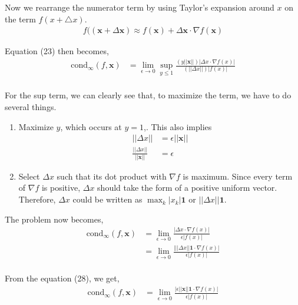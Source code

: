 \documentclass{scrartcl}
\begin{document}
Now we rearrange the numerator term by using Taylor's expansion around $x$ on the term $f(x+\triangle x)$.
\begin{align}
f((\mathbf{x}+\Delta \mathbf{x}) \approx f(\mathbf{x}) + \Delta \mathbf{x} \cdot \nabla f(\mathbf{x})
\end{align}

Equation (23) then becomes, 
\begin{align}
\textrm{cond}_\infty (f,\mathbf{x}) 
&=\lim\limits_{\epsilon \rightarrow 0}\sup_{y \leq 1} \frac{(y||\mathbf{x}||) |\Delta x \cdot \nabla f(x)|}{(||\Delta x||) |f(x)|}\\
\end{align}

For the sup term, we can clearly see that, to maximize the term, we have to do several things.\\
\begin{enumerate}

\item Maximize $y$, which occurs at $y = 1$,. This also implies 
\begin{align}
||\Delta x|| &= \epsilon||\mathbf{x}||\\
\frac{||\Delta x||}{||\mathbf{x}||} &= \epsilon
\end{align}

\item Select $\Delta x$ such that its dot product with $\nabla f$ is maximum. Since every term of $\nabla f$ is positive, $\Delta x$ should take the form of a positive uniform vector. Therefore, $\Delta x$ could be written as $\max_k|x_k|\mathbf{1}$ or $||\Delta x||\mathbf{1}$.
\end{enumerate}

The problem now becomes, 
\begin{align}
\textrm{cond}_\infty (f,\mathbf{x}) 
&=\lim\limits_{\epsilon \rightarrow 0}\frac{|\Delta x \cdot \nabla f(x)|}{ \epsilon |f(x)|}\\
&=\lim\limits_{\epsilon \rightarrow 0}\frac{|||\Delta x||\mathbf{1} \cdot \nabla f(x)|}{ \epsilon |f(x)|}\\
\end{align}

From the equation (28), we get, 
\begin{align}
\textrm{cond}_\infty (f,\mathbf{x}) 
&=\lim\limits_{\epsilon \rightarrow 0}\frac{|\epsilon ||\mathbf{x}||\mathbf{1} \cdot \nabla f(x)|}{ \epsilon |f(x)|}
\end{align}
\end{document}
